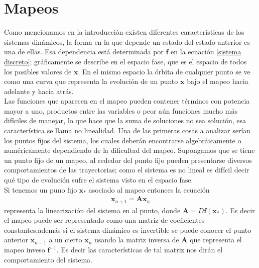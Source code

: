\section{Mapeos}
Como mencionamos en la introducción existen diferentes características de los sistemas dinámicos, la forma en la que depende un estado del estado anterior es una de ellas. Esa dependencia está determinada por $\mathbf{f}$ en la ecuación \ref{sistema discreto}; gráficamente se describe en el espacio fase, que es el espacio de todos los posibles valores de $\pmb x$. En el mismo espacio la órbita de cualquier punto se ve como una curva que representa la evolución de un punto $\pmb x$ bajo el mapeo hacia adelante y hacia atrás. \\

Las funciones que aparecen en el mapeo pueden contener términos con potencia mayor a uno, productos entre las variables o peor aún funciones mucho más difíciles de manejar, lo que hace que la suma de soluciones no sea solución, esa característica se llama no linealidad. Una de las primeras cosas a analizar serían los puntos fijos del sistema, los cuales deberán encontrarse algebráicamente o numéricamente dependiendo de la dificultad del mapeo. Supongamos que se tiene un punto fijo de un mapeo, al rededor del punto fijo pueden presentarse diversos comportamientos de las trayectorias; como el sistema es no lineal es difícil decir qué tipo de evolución sufre el sistema visto en el espacio fase.\\


Si tenemos un puno fijo $\mathbf{x}_{*}$ asociado al mapeo entonces la ecuación
\begin{eqnarray}
\mathbf{x}_{n+1} =\mathbf{A}\mathbf{x}_{n}
\end{eqnarray}
representa la linearización del sistema en al punto, donde $\mathbf{A}=D\mathbf{f}(\mathbf{x}_{*})$. Es decir el mapeo puede ser representado como una matriz de coeficientes constantes,además si el sistema dinámico es invertible se puede conocer el punto anterior $\mathbf{x}_{n-1}$ a un cierto $\mathbf{x}_{n}$ usando la matriz inversa de $\mathbf{A}$ que representa el mapeo inveso $\mathbf{f}^{-1}$. Es decir las características de tal matriz nos dirán el comportamiento del sistema. \\


